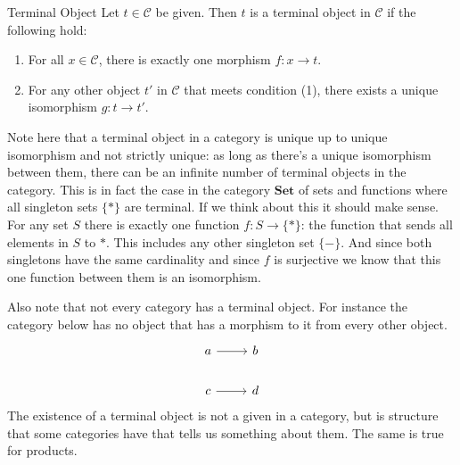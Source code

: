 \documentclass[12pt]{article}
\begin{document}
\begin{definition}{Terminal Object}{}
  Let $t\in\mathcal{C}$ be given. Then $t$ is a terminal object in $\mathcal{C}$ if the following hold:
  \begin{enumerate}
    \item For all $x\in\mathcal{C}$, there is exactly one morphism $f:x\rightarrow t$.
    \item For any other object $t'$ in $\mathcal{C}$ that meets condition (1), there exists a unique isomorphism $g:t\rightarrow t'$.
  \end{enumerate}
\end{definition}
Note here that a terminal object in a category is unique up to unique isomorphism and not strictly unique: as long as there's a unique isomorphism between them, there can be an infinite number of terminal objects in the category.
This is in fact the case in the category $\textbf{Set}$ of sets and functions where all singleton sets $\{*\}$ are terminal.
If we think about this it should make sense.
For any set $S$ there is exactly one function $f:S \rightarrow \{*\}$: the function that sends all elements in $S$ to $*$.
This includes any other singleton set $\{-\}$.
And since both singletons have the same cardinality and since $f$ is surjective we know that this one function between them is an isomorphism.

Also note that not every category has a terminal object.
For instance the category below has no object that has a morphism to it from every other object.
\[\begin{tikzcd}
    a & b \\
    c & d
    \arrow[from=1-1, to=1-2]
    \arrow[from=2-1, to=2-2]
  \end{tikzcd}\]
The existence of a terminal object is not a given in a category, but is structure that some categories have that tells us something about them.
The same is true for products.
\end{document}
